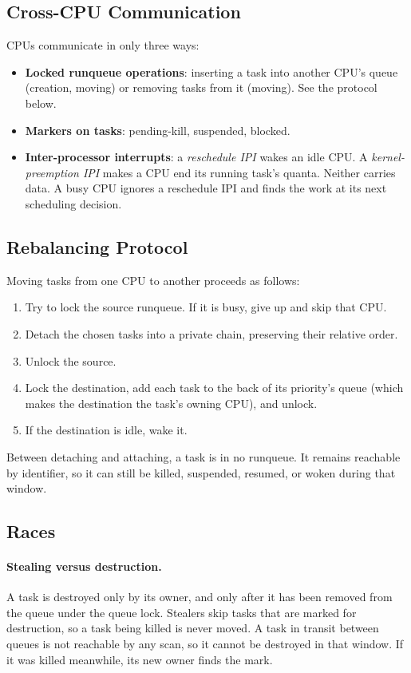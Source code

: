 \documentclass[11pt]{article}
\begin{document}
\subsection{Cross-CPU Communication}

CPUs communicate in only three ways:

\begin{itemize}
	\item \textbf{Locked runqueue operations}: inserting a task into another CPU's queue (creation, moving) or removing tasks from it (moving). See the protocol below.
	\item \textbf{Markers on tasks}: pending-kill, suspended, blocked.
	\item \textbf{Inter-processor interrupts}: a \textit{reschedule IPI} wakes an idle CPU. A \textit{kernel-preemption IPI} makes a CPU end its running task's quanta. Neither carries data. A busy CPU ignores a reschedule IPI and finds the work at its next scheduling decision.
\end{itemize}

\subsection{Rebalancing Protocol}

Moving tasks from one CPU to another proceeds as follows:

\begin{enumerate}
	\item Try to lock the source runqueue. If it is busy, give up and skip that CPU.
	\item Detach the chosen tasks into a private chain, preserving their relative order.
	\item Unlock the source.
	\item Lock the destination, add each task to the back of its priority's queue (which makes the destination the task's owning CPU), and unlock.
	\item If the destination is idle, wake it.
\end{enumerate}

Between detaching and attaching, a task is in no runqueue. It remains reachable by identifier, so it can still be killed, suspended, resumed, or woken during that window.

\subsection{Races}

\paragraph{Stealing versus destruction.}
A task is destroyed only by its owner, and only after it has been removed from the queue under the queue lock.
Stealers skip tasks that are marked for destruction, so a task being killed is never moved.
A task in transit between queues is not reachable by any scan, so it cannot be destroyed in that window.
If it was killed meanwhile, its new owner finds the mark.
\end{document}
